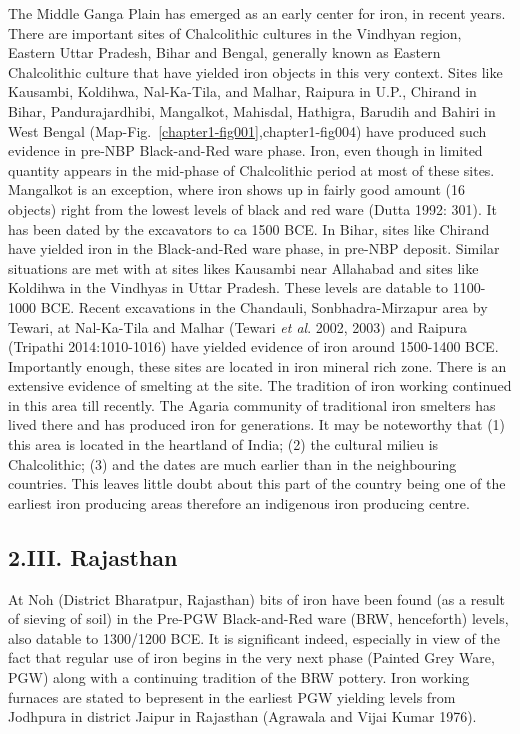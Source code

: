 The Middle Ganga Plain has emerged as an early center for iron, in recent years. There are important sites of Chalcolithic cultures in the Vindhyan region, Eastern Uttar Pradesh, Bihar and Bengal, generally known as Eastern Chalcolithic culture that have yielded iron objects in this very context. Sites like Kausambi, Koldihwa, Nal-Ka-Tila, and Malhar, Raipura in U.P., Chirand in Bihar, Pandurajardhibi, Mangalkot, Mahisdal, Hathigra, Barudih and Bahiri in West Bengal (Map-Fig.~\ref{chapter1-fig001},{chapter1-fig004}) have produced such evidence in pre-NBP Black-and-Red ware phase. Iron, even though in limited quantity appears in the mid-phase of Chalcolithic period at most of these sites. Mangalkot is an exception, where iron shows up in fairly good amount (16 objects) right from the lowest levels of black and red ware (Dutta 1992: 301). It has been dated by the excavators to ca 1500 BCE. In Bihar, sites like Chirand have yielded iron in the Black-and-Red ware phase, in pre-NBP deposit. Similar situations are met with at sites likes Kausambi near Allahabad and sites like Koldihwa in the Vindhyas in Uttar Pradesh. These levels are datable to 1100-1000 BCE. Recent excavations in the Chandauli, Sonbhadra-Mirzapur area by Tewari, at Nal-Ka-Tila and Malhar (Tewari \textit{et al}. 2002, 2003) and Raipura (Tripathi 2014:1010-1016) have yielded evidence of iron around 1500-1400 BCE. Importantly enough, these sites are located in iron mineral rich zone. There is an extensive evidence of smelting at the site. The tradition of iron working continued in this area till recently. The Agaria community of traditional iron smelters has lived there and has produced iron for generations. It may be noteworthy that (1) this area is located in the heartland of India; (2) the cultural milieu is Chalcolithic; (3) and the dates are much earlier than in the neighbouring countries. This leaves little doubt about this part of the country being one of the earliest iron producing areas therefore an indigenous iron producing centre.

\vspace{-.3cm}

\subsection*{2.III. Rajasthan}\label{subsection-6}

\vspace{-.2cm}

At Noh (District Bharatpur, Rajasthan) bits of iron have been found (as a result of sieving of soil) in the Pre-PGW Black-and-Red ware (BRW, henceforth) levels, also datable to 1300/1200 BCE. It is significant indeed, especially in view of the fact that regular use of iron begins in the very next phase (Painted Grey Ware, PGW) along with a continuing tradition of the BRW pottery. Iron working furnaces are stated to be\newpage present in the earliest PGW yielding levels from Jodhpura in district Jaipur in Rajasthan (Agrawala and Vijai Kumar 1976).

